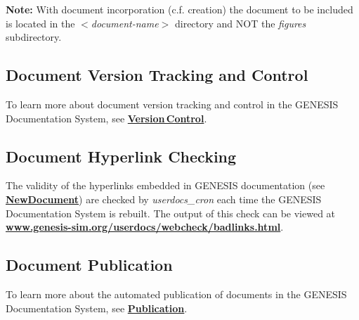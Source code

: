 \documentclass[12pt]{article}
\begin{document}
{\bf Note:} With document incorporation (c.f. creation) the document to be included is located in the {\it $<$document-name$>$} directory and NOT the {\it figures} subdirectory.

\subsection*{Document Version Tracking and Control}

To learn more about document version tracking and control in the GENESIS Documentation System, see \href{../version-control/version-control.tex}{\bf Version\,Control}.

\subsection*{Document Hyperlink Checking}

The validity of the hyperlinks embedded in GENESIS documentation (see \href{../NewDocument/NewDocument.tex}{\bf NewDocument}) are checked by {\it userdocs\_cron} each time the GENESIS Documentation System is rebuilt. The output of this check can be viewed at \href{http://www.genesis-sim.org/userdocs/webcheck/badlinks.html}{\bf www.genesis-sim.org/userdocs/webcheck/badlinks.html}.

\subsection*{Document Publication}

To learn more about the automated publication of documents in the GENESIS Documentation System, see \href{../publication/publication.tex}{\bf Publication}.
\end{document}
